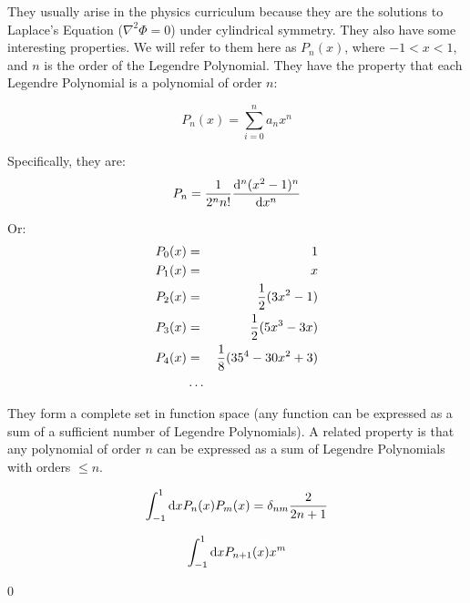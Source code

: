 \begin{answer}
  They usually arise in the physics curriculum because they are the
  solutions to Laplace's Equation ($\nabla^2 \Phi =0$) under
  cylindrical symmetry. They also have some interesting properties. We
  will refer to them here as $P_n(x)$, where $-1 < x < 1$, and $n$ is
  the order of the Legendre Polynomial. They have the property that
  each Legendre Polynomial is a polynomial of order $n$:

  \begin{equation}
    P_n(x) = \sum_{i=0}^n a_n x^n 
  \end{equation}

  Specifically, they are:
  \begin{equation}
    P_n = \frac{1}{2^n n!} \frac{{\rm d}^n(x^2 -1)^n}{{\rm d} x^n}
  \end{equation}

  Or:
  \begin{eqnarray}
    P_0(x) &=& 1 \cr
    P_1(x) &=& x \cr
    P_2(x) &=& \frac{1}{2}(3x^2 -1) \cr
    P_3(x) &=& \frac{1}{2}(5x^3 - 3x) \cr
    P_4(x) &=& \frac{1}{8}(35^4 - 30x^2 + 3) \cr
    &\ldots& 
  \end{eqnarray}

  They form a complete set in function space (any function can be
  expressed as a sum of a sufficient number of Legendre Polynomials).
  A related property is that any polynomial of order $n$ can be
  expressed as a sum of Legendre Polynomials with orders $\le n$.
\end{answer}


\begin{answer}
  \begin{equation}
    \int_{-1}^{1} {\rm d}x P_n(x) P_m(x) = \delta_{nm}
    \frac{2}{2n+1}
  \end{equation}
\end{answer}

  
  \begin{equation}
    \int_{-1}^{1} {\rm d}x P_{n+1}(x) x^m 
  \end{equation}
  
  \begin{answer}
    0
  \end{answer}

